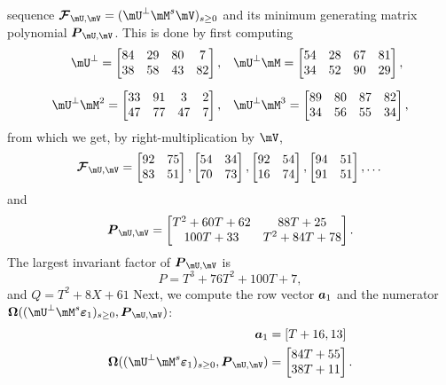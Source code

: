 \documentclass[12pt]{article}
\newcommand{\mat}[1]{\bm{\MakeUppercase{#1}}} %
\newcommand{\row}[1]{\bm{\MakeLowercase{#1}}} %
\newcommand{\col}[1]{\bm{\MakeLowercase{#1}}} %
\newcommand{\seq}{\mat{\mathcal{F}}} %
\newcommand{\sqfree}{Q}
\begin{document}
sequence $\seq_{\mU,\mV} = (\mU^{\perp}\mM^s\mV)_{s\ge0}$ and its
minimum generating matrix polynomial $\mat{P}_{\mU,\mV}$. This is done
by first computing
\begin{align}\label{exampleproducts}
\mU^\perp =
\begin{bmatrix}
 84&  29&  80&   7\\
 38&  58&  43&  82
\end{bmatrix},
& 
\quad \mU^\perp \mM 
=
\begin{bmatrix}
 54&  28&  67&  81\\
 34&  52&  90&  29
\end{bmatrix},
 \\[2mm]
\mU^\perp \mM^2 
=
\begin{bmatrix}
33&  91&   3&  2\\
47&  77&  47&  7
\end{bmatrix},
 &\quad \mU^\perp \mM^3 
=
\begin{bmatrix}
89&  80&  87&  82\\
34&  56&  55&  34
\end{bmatrix}, \nonumber
\end{align}
from which we get, by right-multiplication by $\mV$,
$$ \seq_{\mU,\mV} =
\begin{bmatrix}
92& 75\\  
83& 51
\end{bmatrix},
\begin{bmatrix}
54& 34\\  
70& 73
\end{bmatrix},
\begin{bmatrix}
92& 54\\  
16& 74
\end{bmatrix},
\begin{bmatrix}
94& 51\\
91& 51
\end{bmatrix},\dots
$$
and
$$ \mat{P}_{\mU,\mV} =
\begin{bmatrix}
T^2 + 60T + 62 &       88T + 25\\
     100T + 33 & T^2 + 84T + 78
\end{bmatrix}.
$$
The largest invariant factor of $\mat{P}_{\mU,\mV}$ is 
$$P = T^3 + 76T^2 + 100T + 7,$$
and $\sqfree=T^2+8X+61$
Next, we compute the row vector $\row{a}_1$ and the numerator $\mat{\Omega}( (\mU^\perp \mM^s\col{\varepsilon}_1)_{s \ge 0}, \mat{P}_{\mU,\mV})$:
\begin{align*}
\row{a}_1 &= [T+16,13]\\
\mat{\Omega}( (\mU^\perp \mM^s\col{\varepsilon}_1)_{s \ge 0}, \mat{P}_{\mU,\mV}) 
&=\left [\begin{matrix} 84T + 55 \\ 38T + 11   \end{matrix}\right ].
\end{align*}
\end{document}
